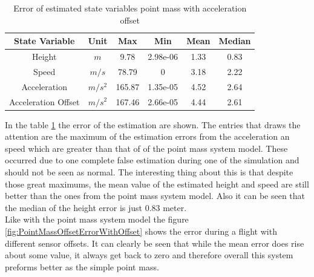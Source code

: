 \begin{table}[h!]
\centering
\begin{tabular}{cccccc}
\hline
\multicolumn{1}{|c|}{State Variable} & \multicolumn{1}{c|}{Unit} & \multicolumn{1}{c|}{Max} & \multicolumn{1}{c|}{Min} & \multicolumn{1}{c|}{Mean} & \multicolumn{1}{c|}{Median} \\ \hline
Height                            & $m$                         & 9.78                   & 2.98e-06                 & 1.33                    & 0.83                      \\
Speed                             & $m/s$                       & 78.79                  & 0                        & 3.18                    & 2.22                      \\
Acceleration                       & $m/s^2$   			& 165.87                  & 1.35e-05                 & 4.52                    & 2.64                     \\
Acceleration Offset                & $m/s^2$   			& 167.46                  & 2.66e-05                 & 4.44                    & 2.61                     
\end{tabular}
\caption{Error of estimated state variables point mass with acceleration offset}
\label{tab:ErrorPointMassAccelerationOffset}
\end{table}

In the table \ref{tab:ErrorPointMassAccelerationOffset} the error of the estimation are shown.
The entries that draws the attention are the maximum of the estimation errors from the acceleration an speed which are greater than that of of the point mass system model.
These occurred due to one complete false estimation during one of the simulation and should not be seen as normal.
The interesting thing about this is that despite those great maximums, the mean value of the estimated height and speed are still better than the ones from the point mass system model.
Also it can be seen that the median of the height error is just 0.83 meter. \\

Like with the point mass system model the figure \ref{fig:PointMassOffsetErrorWithOffset} shows the error during a flight with different sensor offsets.
It can clearly be seen that while the mean error does rise about some value, it always get back to zero and therefore overall this system preforms better as the simple point mass.

